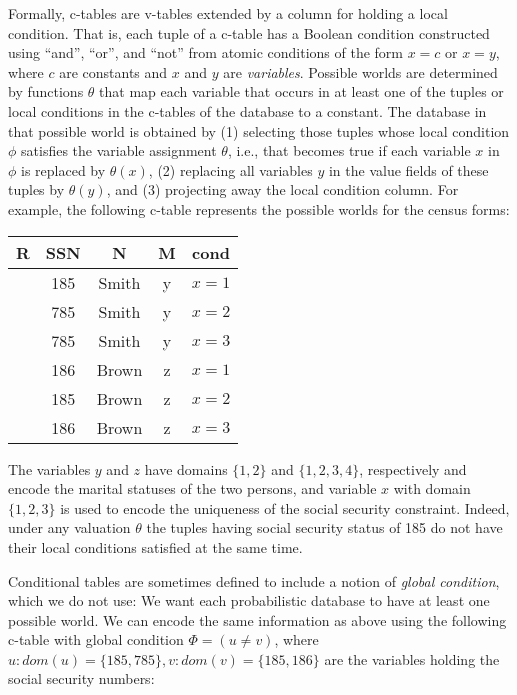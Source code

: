 Formally, c-tables are v-tables extended by a column for holding a local condition. That is, each tuple of a c-table has a Boolean condition constructed using ``and'', ``or'', and ``not'' from atomic conditions of the form $x = c$ or $x = y$, where $c$ are constants and $x$ and $y$ are {\em variables}\/.
Possible worlds are determined by functions $\theta$ that map each variable that occurs in at least one of the tuples or local conditions in the c-tables of the database to a constant. The database in that possible world is obtained by (1) selecting those tuples whose local condition $\phi$ satisfies the variable assignment $\theta$, i.e., that becomes true if each variable $x$ in $\phi$ is replaced by $\theta(x)$, (2) replacing all variables $y$ in the value fields of these tuples by $\theta(y)$, and (3) projecting away the local condition column. For example, the following c-table represents the possible
worlds for the census forms:

\begin{center}
	\begin{tabular}{c|c|c|c|c}
		\hline
		R & SSN & N & M & cond\\\hline
		  & 185 & Smith & y & $x = 1$\\
		  & 785 & Smith & y & $x = 2$\\
		  & 785 & Smith & y & $x = 3$\\
		  & 186 & Brown & z & $x = 1$\\
		  & 185 & Brown & z & $x = 2$\\
		  & 186 & Brown & z & $x = 3$\\
	\end{tabular}
\end{center}

The variables $y$ and $z$ have domains $\{1,2\}$ and $\{1,2,3,4\}$, respectively and encode the marital statuses of the two persons, and variable
$x$ with domain $\{1,2,3\}$ is used to encode the uniqueness of the social security constraint. Indeed, under any valuation $\theta$ the tuples having social security status of 185 do not have their local conditions satisfied at the same time.

Conditional tables are sometimes defined to include a notion of {\em global condition}\/, which
we do not use: We want each probabilistic database to have at least one possible world. We can encode the same information as above using the following c-table with global condition $\Phi = (u\neq v)$, where $u: dom(u) = \{185,785\}, v: dom(v) = \{185,186\}$ are the variables holding the social security numbers:


